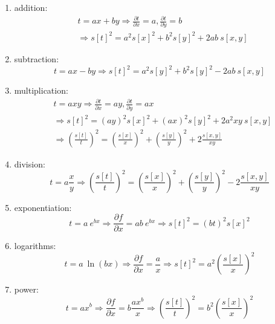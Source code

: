 \begin{enumerate}
\item{addition:}
\begin{align}
& t = a x + b y \Rightarrow \frac{\partial t}{\partial x} = a, 
\frac{\partial t}{\partial y} = b \nonumber\\
& \Rightarrow s[t]^2 = a^2 s[x]^2 + b^2 s[y]^2 + 2ab~s[x,y]
\label{eq:addition}
\end{align}

\item{subtraction:}
\begin{equation}
t = a x - b y \Rightarrow
s[t]^2 = a^2 s[y]^2 + b^2 s[y]^2 - 2ab~s[x,y]
\label{eq:subtraction}
\end{equation}

\item{multiplication:}
\begin{align}
& t = a x y \Rightarrow \frac{\partial t}{\partial x} = a y, 
\frac{\partial t}{\partial y} = ax \nonumber\\
& \Rightarrow s[t]^2 = (ay)^2 s[x]^2 + (ax)^2 s[y]^2 + 2a^2 xy~s[x,y] \nonumber\\
& \Rightarrow \left(\frac{s[t]}{t}\right)^2 = \left(\frac{s[x]}{x}\right)^2 + 
  \left(\frac{s[y]}{y}\right)^2 + 2 \frac{s[x,y]}{x y}
\label{eq:multiplication}
\end{align}

\item{division:}
\begin{equation}
t = a \frac{x}{y} \Rightarrow
\left(\frac{s[t]}{t}\right)^2 = \left(\frac{s[x]}{x}\right)^2 + 
  \left(\frac{s[y]}{y}\right)^2 - 2 \frac{s[x,y]}{x y}
\label{eq:division}
\end{equation}

\item{exponentiation:}
\begin{equation}
t = a~e^{bx} \Rightarrow \frac{\partial f}{\partial x} = ab~e^{bx} 
\Rightarrow s[t]^2 = (b t)^2 s[x]^2
\label{eq:exponentiation}
\end{equation}

\item{logarithms:}
\begin{equation}
t = a~\ln(bx) \Rightarrow \frac{\partial f}{\partial x} = \frac{a}{x}
\Rightarrow s[t]^2 = a^2 \left(\frac{s[x]}{x}\right)^2
\label{eq:logarithms}
\end{equation}

\item{power:}
\begin{equation}
  t = a x^b \Rightarrow \frac{\partial f}{\partial x} = b \frac{a
    x^b}{x} \Rightarrow \left(\frac{s[t]}{t}\right)^2 =
  b^2\left(\frac{s[x]}{x}\right)^2
\label{eq:power}
\end{equation}

\end{enumerate}

